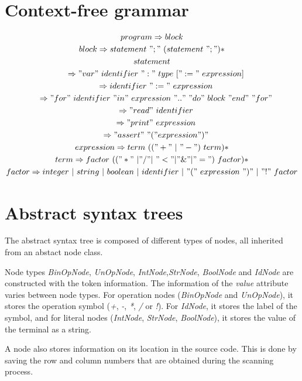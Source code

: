 \documentclass[fleqn]{article}
\begin{document}
\section{Context-free grammar}
\begin{gather*}
    program \Rightarrow block \\
    block \Rightarrow statement \ ";" \ (statement \ ";")* \\
    statement \\
    \quad \Rightarrow "var" \ identifier \ ":" \ type \ [ ":=" expression ] \\
    \quad \Rightarrow identifier \ ":=" \ expression \\
    \quad \Rightarrow "for" \ identifier \ "in"  expression \ ".." \ "do" \ block \ "end" \ "for" \\
    \quad \Rightarrow "read" \ identifier \\
    \quad \Rightarrow "print" \ expression \\
    \quad \Rightarrow "assert" \ "(" expression ")" \\
    expression \Rightarrow term \ (("+" \ | \ "-") \ term)* \\
    term \Rightarrow factor \ (("*" \ | "/" | "<" | "\&" | "=") \ factor)*  \\
    factor \Rightarrow integer \ | \ string \ | \ boolean \ | \ identifier \ | "(" \ expression \ ")" \ | \ "!" factor
\end{gather*}

\newpage
\section{Abstract syntax trees}
The abstract syntax tree is composed of different types of nodes, all inherited from an abstact node class.
\par
Node types \textit{BinOpNode}, \textit{UnOpNode}, \textit{IntNode},\textit{StrNode}, \textit{BoolNode} and \textit{IdNode}
are constructed with the token information. The information of the \textit{value} attribute varies between node types.
For operation nodes (\textit{BinOpNode} and \textit{UnOpNode}), it stores the operation symbol (\textit{+}, \textit{-}, \textit{*}, \textit{/} or \textit{!}).
For \textit{IdNode}, it stores the label of the symbol, and for literal nodes (\textit{IntNode}, \textit{StrNode}, \textit{BoolNode}),
it stores the value of the terminal as a string.
\par
A node also stores information on its location in the source code. This is done by saving the row and column numbers that are obtained during the scanning process.
\end{document}
